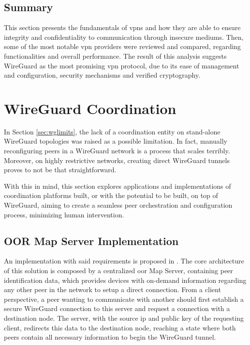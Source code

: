 \documentclass[11pt,twoside,a4paper]{report}
\begin{document}
\subsection{Summary}

This section presents the fundamentals of \acp{vpn} and how they are able to ensure integrity and confidentiality to communication through insecure mediums. Then, some of the most notable \ac{vpn} providers were reviewed and compared, regarding functionalities and overall performance. The result of this analysis suggests WireGuard as the most promising \ac{vpn} protocol, due to its ease of management and configuration, security mechanisms and verified cryptography.


\section{WireGuard Coordination}
\label{sec:coordination}

In Section \ref{sec:wglimits}, the lack of a coordination entity on stand-alone WireGuard topologies was raised as a possible limitation. In fact, manually reconfiguring peers in a WireGuard network is a process that scales terribly. Moreover, on highly restrictive networks, creating direct WireGuard tunnels proves to not be that straightforward.

With this in mind, this section explores applications and implementations of coordination platforms built, or with the potential to be built, on top of WireGuard, aiming to create a seamless peer orchestration and configuration process, minimizing human intervention.


\iffalse
\subsection{OOR Map Server Implementation}

An implementation with said requirements is proposed in \cite{paillisse2021control}. The core architecture of this solution is composed by a centralized \ac{oor} Map Server, containing peer identification data, which provides devices with on-demand information regarding any other peer in the network to setup a direct connection.  From a client perspective, a peer wanting to communicate with another should first establish a secure WireGuard connection to this server and request a connection with a destination node. The server, with the source \ac{ip} and public key of the requesting client, redirects this data to the destination node, reaching a state where both peers contain all necessary information to begin the WireGuard tunnel.
\end{document}
